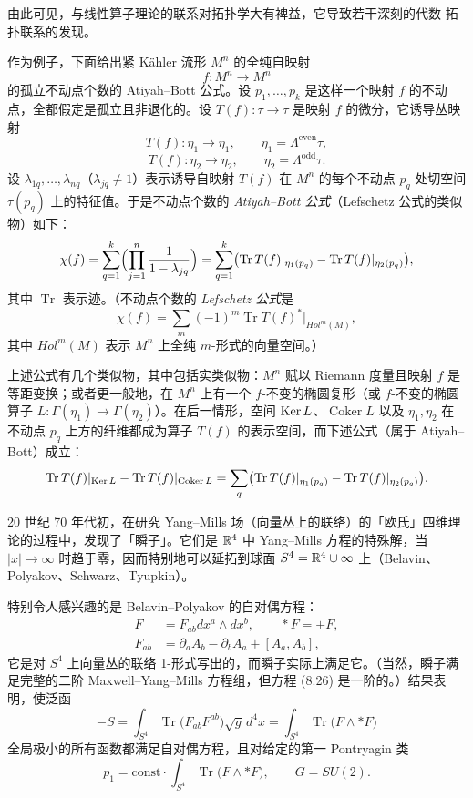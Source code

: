 由此可见，与线性算子理论的联系对拓扑学大有裨益，它导致若干深刻的代数-拓扑联系的发现。

作为例子，下面给出紧 Kähler 流形 $M^n$ 的全纯自映射
\[
f:M^n\longrightarrow M^n
\]
的孤立不动点个数的 Atiyah--Bott 公式。设 $p_1,\dots,p_k$ 是这样一个映射 $f$ 的不动点，全都假定是孤立且非退化的。设 $T(f):\tau\to\tau$ 是映射 $f$ 的微分，它诱导丛映射
\[
T(f):\eta_1\longrightarrow\eta_1,\qquad \eta_1=\Lambda^{\mathrm{even}}\tau,
\]
\[
T(f):\eta_2\longrightarrow\eta_2,\qquad \eta_2=\Lambda^{\mathrm{odd}}\tau.
\]
设 $\lambda_{1q},\dots,\lambda_{nq}$（$\lambda_{jq}\ne1$）表示诱导自映射 $T(f)$ 在 $M^n$ 的每个不动点 $p_q$ 处切空间 $\tau(p_q)$ 上的特征值。于是不动点个数的 \emph{Atiyah--Bott 公式}（Lefschetz 公式的类似物）如下：
\[
\chi(f)=\sum_{q=1}^{k}\Bigl(\prod_{j=1}^{n}\frac{1}{1-\lambda_{jq}}\Bigr)=\sum_{q=1}^{k}\bigl(\operatorname{Tr}T(f)|_{\eta_1(p_q)}-\operatorname{Tr}T(f)|_{\eta_2(p_q)}\bigr),
\]
其中 $\operatorname{Tr}$ 表示迹。（不动点个数的 \emph{Lefschetz 公式}是
\[
\chi(f)=\sum_m(-1)^m\operatorname{Tr}T(f)^*|_{Hol^m(M)},
\]
其中 $Hol^m(M)$ 表示 $M^n$ 上全纯 $m$-形式的向量空间。）

上述公式有几个类似物，其中包括实类似物：$M^n$ 赋以 Riemann 度量且映射 $f$ 是等距变换；或者更一般地，在 $M^n$ 上有一个 $f$-不变的椭圆复形（或 $f$-不变的椭圆算子 $L:\Gamma(\eta_1)\to\Gamma(\eta_2)$）。在后一情形，空间 $\operatorname{Ker} L$、$\operatorname{Coker}L$ 以及 $\eta_1,\eta_2$ 在不动点 $p_q$ 上方的纤维都成为算子 $T(f)$ 的表示空间，而下述公式（属于 Atiyah--Bott）成立：
\[
\operatorname{Tr}T(f)|_{\operatorname{Ker} L}-\operatorname{Tr}T(f)|_{\operatorname{Coker}L}=\sum_q\bigl(\operatorname{Tr}T(f)|_{\eta_1(p_q)}-\operatorname{Tr}T(f)|_{\eta_2(p_q)}\bigr).
\]

20 世纪 70 年代初，在研究 Yang--Mills 场（向量丛上的联络）的「欧氏」四维理论的过程中，发现了「瞬子」。它们是 $\mathbb{R}^4$ 中 Yang--Mills 方程的特殊解，当 $|x|\to\infty$ 时趋于零，因而特别地可以延拓到球面 $S^4=\mathbb{R}^4\cup\infty$ 上（Belavin、Polyakov、Schwarz、Tyupkin）。

特别令人感兴趣的是 Belavin--Polyakov 的自对偶方程：
\begin{equation}
\begin{aligned}
F&=F_{ab}dx^a\wedge dx^b,\qquad *F=\pm F,\\
F_{ab}&=\partial_aA_b-\partial_bA_a+[A_a,A_b],
\end{aligned}
\tag{8.26}
\end{equation}
它是对 $S^4$ 上向量丛的联络 1-形式写出的，而瞬子实际上满足它。（当然，瞬子满足完整的二阶 Maxwell--Yang--Mills 方程组，但方程 (8.26) 是一阶的。）结果表明，使泛函
\[
-S=\int_{S^4}\operatorname{Tr}\bigl(F_{ab}F^{ab}\bigr)\sqrt{g}\,d^4x=\int_{S^4}\operatorname{Tr}\bigl(F\wedge*F\bigr)
\]
全局极小的所有函数都满足自对偶方程，且对给定的第一 Pontryagin 类
\[
p_1=\mathrm{const}\cdot\int_{S^4}\operatorname{Tr}\bigl(F\wedge*F\bigr),\qquad G=SU(2).
\]

